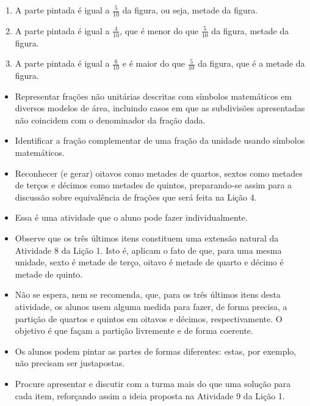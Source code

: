\begin{multicols}{2}
\begin{solucao}{}{}
\begin{enumerate} [\quad a)] %
    \item A parte pintada é igual a $\frac{5}{10}$ da figura, ou seja, metade da figura.
    \item A parte pintada é igual a $\frac{4}{10}$, que é menor do que       $\frac{5}{10}$ da figura, metade da figura.
    \item  A parte pintada é igual a $\frac{6}{10}$ e é maior do que       $\frac{5}{10}$ da figura, que é a metade da figura.
\end{enumerate} %

\end{solucao}




\begin{objetivos}[label=chap2-ativ9]{}{}
  \begin{itemize} %
    \item       Representar frações não unitárias descritas com símbolos matemáticos em diversos modelos de área, incluindo casos em que as subdivisões apresentadas não coincidem com o denominador da fração dada.
    \item       Identificar a fração complementar de uma fração da unidade usando símbolos matemáticos.
    \item       Reconhecer (e gerar) oitavos como metades de quartos, sextos como metades de terços e décimos como metades de quintos, preparando-se assim para a discussão sobre equivalência de frações que será feita na Lição 4.
\end{itemize} %
\end{objetivos}

\begin{orientacoes}
\begin{itemize} %
    \item       Essa é uma atividade que o aluno pode fazer individualmente.
    \item       Observe que os três últimos itens constituem uma extensão natural da Atividade 8 da Lição 1. Isto é, aplicam o fato de que, para uma mesma unidade, sexto é metade de terço, oitavo é metade de quarto e décimo é metade de quinto.
    \item       Não se espera, nem se recomenda, que, para os três últimos itens desta atividade, os alunos usem alguma medida para fazer, de forma precisa, a partição de quartos e quintos em oitavos e décimos, respectivamente. O objetivo é que façam a partição livremente e de forma coerente.
    \item Os alunos podem pintar as partes de formas diferentes: estas, por exemplo, não precisam ser justapostas.
    \item Procure apresentar e discutir com a turma mais do que uma solução para cada item, reforçando assim a ideia proposta na Atividade 9 da Lição 1.
\end{itemize} %



\end{orientacoes}
\end{multicols}
